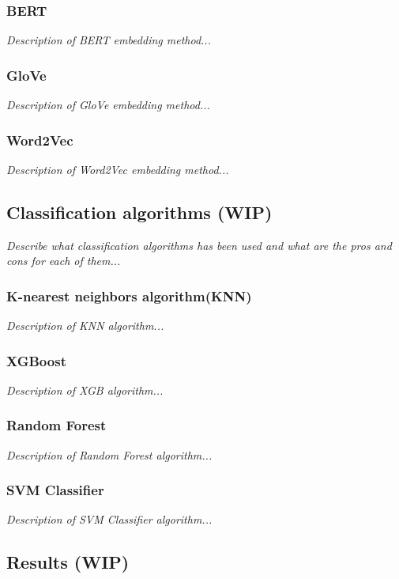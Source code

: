 \subsubsection{BERT}
\textit{Description of BERT embedding method...}

\subsubsection{GloVe}
\textit{Description of GloVe embedding method...}

\subsubsection{Word2Vec}
\textit{Description of Word2Vec embedding method...}


\subsection{Classification algorithms (WIP)}
\textit{Describe what classification algorithms has been used and what are the pros and cons for each of them...}

\subsubsection{K-nearest neighbors algorithm(KNN)}
\textit{Description of KNN algorithm...}

\subsubsection{XGBoost}
\textit{Description of XGB algorithm...}

\subsubsection{Random Forest}
\textit{Description of Random Forest algorithm...}

\subsubsection{SVM Classifier}
\textit{Description of SVM Classifier algorithm...}


\subsection{Results (WIP)}


